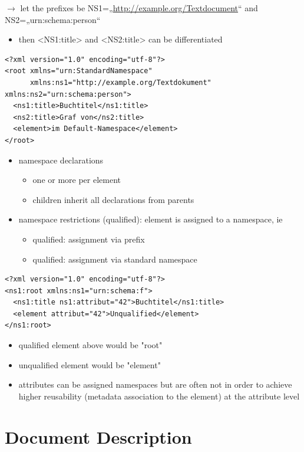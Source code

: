 \documentclass[11pt]{article}
\begin{document}
\(\rightarrow\) let the prefixes be NS1=„\url{http://example.org/Textdocument}“ and NS2=„urn:schema:person“
\begin{itemize}
\item then <NS1:title> and <NS2:title> can be differentiated
\end{itemize}
\lstset{breaklines=true,language=XML,label= ,caption= ,captionpos=b,numbers=none}
\begin{lstlisting}
<?xml version="1.0" encoding="utf-8"?>
<root xmlns="urn:StandardNamespace"
      xmlns:ns1="http://example.org/Textdokument" xmlns:ns2="urn:schema:person">
  <ns1:title>Buchtitel</ns1:title>
  <ns2:title>Graf von</ns2:title>
  <element>im Default-Namespace</element>
</root>
\end{lstlisting}
\begin{itemize}
\item namespace declarations
\begin{itemize}
\item one or more per element
\item children inherit all declarations from parents
\end{itemize}
\item namespace restrictions (qualified): element is assigned to a namespace, ie
\begin{itemize}
\item qualified: assignment via prefix
\item qualified: assignment via standard namespace
\end{itemize}
\end{itemize}

\lstset{breaklines=true,language=XML,label= ,caption= ,captionpos=b,numbers=none}
\begin{lstlisting}
<?xml version="1.0" encoding="utf-8"?>
<ns1:root xmlns:ns1="urn:schema:f">
  <ns1:title ns1:attribut="42">Buchtitel</ns1:title>
  <element attribut="42">Unqualified</element>
</ns1:root>
\end{lstlisting}
\begin{itemize}
\item qualified element above would be "root"
\item unqualified element would be "element"
\item attributes can be assigned namespaces but are often not in order to achieve higher reusability (metadata association to the element) at the attribute level
\end{itemize}
\section{Document Description}
\label{sec:org324b285}
\end{document}
